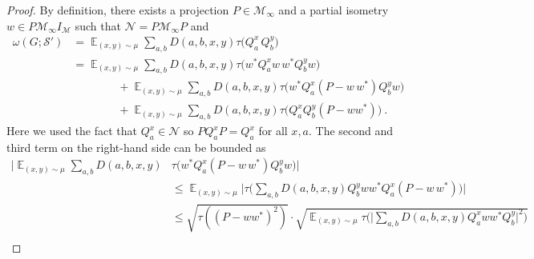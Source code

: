 \documentclass[11pt]{article}
\theoremstyle{definition}
\newcommand{\strategy}{\mathscr{S}}
\newcommand{\ket}[1]{|#1\rangle}
\newcommand{\bra}[1]{\langle#1|}
\DeclareMathOperator*{\Expectation}{\mathbb{E}}
\newcommand{\Es}[1]{\Expectation_{#1}}
\newcommand{\mM}{\ensuremath{\mathcal{M}}}
\newcommand{\eps}{\varepsilon}
\newcommand{\mN}{\mathcal{N}}
\begin{document}
\begin{proof}
By definition, there exists a projection $P \in \mM_\infty$ and a partial isometry $w \in P \mM_\infty I_\mM$ such that $\mN = P \mM_\infty P$ and
\begin{align*}
\omega(G;\strategy') &= \Es{(x,y)\sim\mu} \sum_{a,b} D(a,b,x,y)  \tau\big( Q^x_a \, Q^y_b \big)\\
&=  \Es{(x,y)\sim\mu} \sum_{a,b} D(a,b,x,y)  \tau\big( w^* Q^x_a w\, w^* Q^y_b w\big)\\
&\qquad\qquad+  \Es{(x,y)\sim\mu} \sum_{a,b} D(a,b,x,y)  \tau\big( w^* Q^x_a (P - w\, w^* ) Q^y_b w\big) \\
&\qquad\qquad+ \Es{(x,y)\sim\mu} \sum_{a,b} D(a,b,x,y)  \tau\big(Q^x_a  Q^y_b (P-ww^*)\big)~.
\end{align*}
Here we used the fact that $Q^x_a \in \mN$ so $P Q^x_a P = Q^x_a$ for all $x,a$. 
The second and third term on the right-hand side can be bounded as
\begin{align*}
\Big|\Es{(x,y)\sim\mu} \sum_{a,b} D(a,b,x,y) & \tau\big( w^* Q^x_a (P - w\, w^* ) Q^y_b w\big)\Big|\\
&\leq \Es{(x,y)\sim\mu} \Big | \tau\big( \sum_{a,b} D(a,b,x,y)   Q^y_b w w^* Q^x_a (P - w\, w^* ) \big) \Big | \\
&\leq \sqrt{ \tau((P - ww^*)^2)} \cdot \sqrt{\Es{(x,y)\sim\mu} \tau\big( \big| \sum_{a,b} D(a,b,x,y)   Q^x_a w w^* Q^y_b \big|^2 \big) } \\

\end{align*}
\end{proof}
\end{document}
